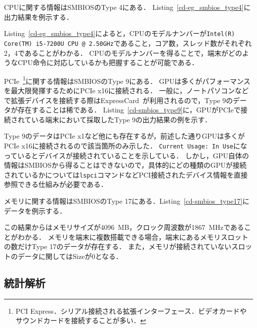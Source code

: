 CPUに関する情報はSMBIOSのType 4にある．
Listing~\ref{cd-eg_smbios_type4}に出力結果を例示する．



Listing~\ref{cd-eg_smbios_type4}によると，CPUのモデルナンバーが\texttt{Intel(R) Core(TM) i5-7200U CPU @ 2.50GHz}であること，コア数，スレッド数がそれぞれ2，4であることがわかる．
CPUのモデルナンバーを得ることで，端末がどのようなCPU命令に対応しているかも把握することが可能である．

PCIe~\footnote{PCI Express．シリアル接続される拡張インターフェース．ビデオカードやサウンドカードを接続することが多い．}に関する情報はSMBIOSのType 9にある．
GPUは多くがパフォーマンスを最大限発揮するためにPCIe x16に接続される．
一般に，ノートパソコンなどで拡張デバイスを接続する際はExpressCard~\cite{express_card}が利用されるので，Type 9のデータが存在することは稀である．
Listing~\ref{cd-smbios_type9}に，GPUがPCIeで接続されている端末において採取したType 9の出力結果の例を示す．



Type 9のデータはPCIe x1など他にも存在するが，前述した通りGPUは多くがPCIe x16に接続されるので該当箇所のみ示した．
\texttt{Current Usage: In Use}になっているとデバイスが接続されていることを示している．
しかし，GPU自体の情報はSMBIOSから得ることはできないので，具体的にどの種類のGPUが接続されているかについては\texttt{lspci}コマンドなどPCI接続されたデバイス情報を直接参照できる仕組みが必要である．

メモリに関する情報はSMBIOSのType 17にある．Listing~\ref{cd-smbios_type17}にデータを例示する．



この結果からはメモリサイズが4096~MB，クロック周波数が1867~MHzであることがわかる．
メモリを端末に複数搭載できる場合，端末にあるメモリスロットの数だけType 17のデータが存在する．
また，メモリが接続されていないスロットのデータに関してはSizeが0となる．
\subsection{統計解析}
